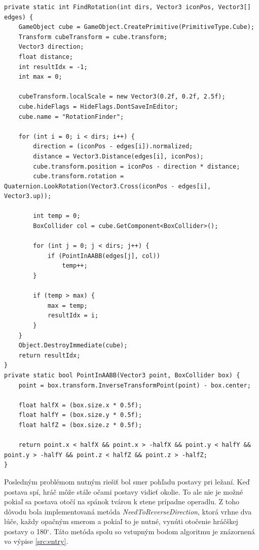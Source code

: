 \documentclass[slovak, bachelorpractice]{diploma}
\begin{document}
\vspace{10pt}
\begin{lstlisting}[label=src:findRot,caption={Získanie korektnej rotácie hráčskej postavy pri ležaní}]
private static int FindRotation(int dirs, Vector3 iconPos, Vector3[] edges) {
    GameObject cube = GameObject.CreatePrimitive(PrimitiveType.Cube);
    Transform cubeTransform = cube.transform;
    Vector3 direction;
    float distance;
    int resultIdx = -1;
    int max = 0;
    
    cubeTransform.localScale = new Vector3(0.2f, 0.2f, 2.5f);
    cube.hideFlags = HideFlags.DontSaveInEditor;
    cube.name = "RotationFinder";
    
    for (int i = 0; i < dirs; i++) {
        direction = (iconPos - edges[i]).normalized;
        distance = Vector3.Distance(edges[i], iconPos);
        cube.transform.position = iconPos - direction * distance;
        cube.transform.rotation = Quaternion.LookRotation(Vector3.Cross(iconPos - edges[i], Vector3.up));

        int temp = 0;
        BoxCollider col = cube.GetComponent<BoxCollider>();
        
        for (int j = 0; j < dirs; j++) {
            if (PointInAABB(edges[j], col))
                temp++;
        }

        if (temp > max) {
            max = temp;
            resultIdx = i;
        }
    }
    Object.DestroyImmediate(cube);
    return resultIdx;
}
private static bool PointInAABB(Vector3 point, BoxCollider box) {
    point = box.transform.InverseTransformPoint(point) - box.center;

    float halfX = (box.size.x * 0.5f);
    float halfY = (box.size.y * 0.5f);
    float halfZ = (box.size.z * 0.5f);

    return point.x < halfX && point.x > -halfX && point.y < halfY && point.y > -halfY && point.z < halfZ && point.z > -halfZ;
}
\end{lstlisting}

Posledným problémom nutným riešiť bol smer pohľadu postavy pri ležaní. Keď postava spí, hráč môže stále očami postavy vidieť okolie. To ale nie je možné pokiaľ sa postava otočí na spánok tvárou k stene prípadne operadlu. Z toho dôvodu bola implementovaná metóda \textit{NeedToReverseDirection}, ktorá vrhne dva lúče, každy opačným smerom a pokiaľ to je nutné, vynúti otočenie hráčškej postavy o 180$^{\circ}$. Táto metóda spolu so vstupným bodom algoritmu je znázornená vo výpise \ref{src:entry}.
\end{document}
